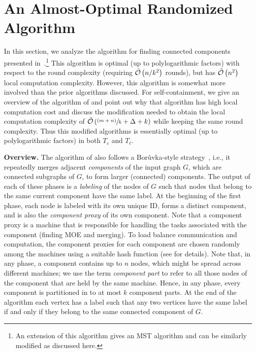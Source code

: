 \section{An Almost-Optimal Randomized  Algorithm}\label{sec:kmachine-mst-optimal}
In this section, we analyze the algorithm for finding connected components presented in~\cite{topc18}.\footnote{An extension  of this algorithm gives an MST algorithm and can be similarly modified as discussed here.} This algorithm is optimal (up to polylogarithmic factors) with respect
to the round complexity (requiring $\tilde{\mathcal{O}}\left(n/k^2\right)$ rounds), but has  $\tilde{\mathcal{O}}\left(n^2\right)$
local computation complexity. However, this algorithm is somewhat more involved than the prior algorithms discussed. For self-containment, we give an overview of the algorithm
of \cite{topc18} and point out why that algorithm has high local computation cost
and discuss the modification needed to obtain the local computation complexity of $\tilde{\mathcal{O}}\left(\sfrac{(m+n)}{k} + \Delta + k\right)$  while keeping the same round complexity. Thus this modified algorithms is essentially optimal (up to polylogarithmic factors)
in both $T_c$ and $T_{\ell}$.

\textbf{Overview.}
The algorithm of \cite{topc18} also follows a Bor\r{u}vka-style strategy~\cite{Boruvka26}, i.e., it repeatedly merges
adjacent \emph{components} of the input graph $G$, which are connected subgraphs of $G$, to form
larger (connected) components. The output of each of these phases is a \emph{labeling} of the nodes of $G$
such that nodes that belong to the same current component have the same label. At the beginning of
the first phase, each node is labeled with its own unique ID, forms a distinct component, and is also the
\emph{component proxy} of its own component. Note that a component proxy is a machine
that is responsible for handling the tasks associated with the component (finding MOE and merging). To load balance communication and computation, the component proxies for each component are chosen randomly among the machines using a 
suitable hash function (see \cite{topc18} for details).  Note that, in any phase, a component contains up
to $n$ nodes, which might be spread across different machines; we use the term \emph{component part}
to refer to all those nodes of the component that are held by the same machine. Hence, in any phase,
every component is partitioned in to at most $k$ component parts. At the end of the algorithm each vertex
has a label such that any two vertices have the same label if and only if they belong to the same connected
component of $G$.

